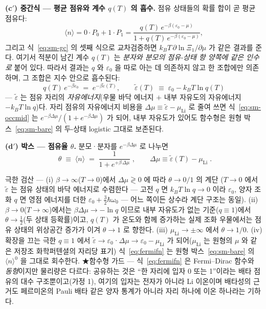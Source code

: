 \textbf{(c$'$) 중간식 --- 평균 점유와 계수 $q(T)$ 의 흡수.} 점유 상태들의 확률 합이 곧 평균 점유다:
\begin{equation}
\langle n\rangle=0\cdot P_0+1\cdot P_1
=\frac{q(T)\,e^{-\beta(\varepsilon_0-\mu)}}{1+q(T)\,e^{-\beta(\varepsilon_0-\mu)}},
\label{eq:sm-occmid}
\end{equation}
그리고 식~\eqref{eq:sm-gc} 의 셋째 식으로 교차검증하면 $k_BT\,\partial\ln\Xi_1/\partial\mu$ 가 같은
결과를 준다. 여기서 적분이 남긴 계수 $q(T)$ 는 \emph{분자와 분모의 점유-상태 항 양쪽에 같은 인수로}
붙어 있다. 따라서 결과는 $q$ 와 $\varepsilon_0$ 을 따로 아는 데 의존하지 않고 한 조합에만 의존하며,
그 조합은 지수 안으로 흡수된다:
\begin{equation}
q(T)\,e^{-\beta\varepsilon_0}\;=\;e^{-\beta\tilde\varepsilon(T)},
\qquad
\tilde\varepsilon(T)\;\equiv\;\varepsilon_0-k_BT\ln q(T)
\label{eq:sm-epstilde}
\end{equation}
--- $\tilde\varepsilon$ 는 점유 자리의 \emph{자유에너지}(우물 바닥 에너지 $+$ 내부 자유도의 자유에너지
$-k_BT\ln q$)다. 자리 점유의 자유에너지 비용을 $\Delta\mu\equiv\tilde\varepsilon-\mu_\mathrm{Li}$ 로
줄여 쓰면 식~\eqref{eq:sm-occmid} 는 $e^{-\beta\Delta\mu}/(1+e^{-\beta\Delta\mu})$ 가 되어, 내부
자유도가 있어도 함수형은 원형 박스~\eqref{eq:sm-bare} 의 두-상태 logistic 그대로 보존된다.

\textbf{(d$'$) 박스 --- 점유율 $\theta$.} 분모·분자를 $e^{-\beta\Delta\mu}$ 로 나누면
\begin{equation}
\boxed{\;\theta\;\equiv\;\langle n\rangle\;=\;\frac{1}{1+e^{+\beta\,\Delta\mu}}\;,
\qquad \Delta\mu\equiv\tilde\varepsilon(T)-\mu_\mathrm{Li}\;.}
\label{eq:fermifn}
\end{equation}
\begin{verifybox}
극한 검산 --- (i) $\beta\to\infty$($T\to0$)에서 $\Delta\mu\gtrless0$ 에 따라 $\theta\to0/1$ 의 계단
($T\to0$ 에서 $\tilde\varepsilon$ 는 점유 상태의 바닥 에너지로 수렴한다 --- 고전 $q$ 면 $k_BT\ln q\to0$
이라 $\varepsilon_0$, 양자 조화 $q$ 면 영점 에너지를 더한 $\varepsilon_0+\tfrac32\hbar\omega_0$ --- 어느
쪽이든 상수라 계단 구조는 동일). (ii) $\beta\to0$($T\to\infty$)에서는 $\beta\Delta\mu\to-\ln q$ 이므로
내부 자유도가 없는 기준($q\equiv1$)에서 $\theta\to\tfrac12$(두 상태 등확률)이고, $q(T)$ 가 온도와 함께
증가하는 실제 조화 우물에서는 점유 상태의 위상공간 증가가 이겨 $\theta\to1$ 로 향한다.
(iii) $\mu_\mathrm{Li}\to\pm\infty$ 에서 $\theta\to1/0$. (iv) 확장을 끄는 극한 $q\equiv1$ 에서
$\tilde\varepsilon\to\varepsilon_0$·$\Delta\mu\to\varepsilon_0-\mu_\mathrm{Li}$ 가 되어($\mu_\mathrm{Li}$ 는 원형의 $\mu$ 와
같은 저장조 화학퍼텐셜의 자리당 표기) 식~\eqref{eq:fermifn} 는 원형 박스~\eqref{eq:sm-bare} 의 $\langle n\rangle^{0}$ 을 그대로 회수한다.
★함수형 가드 --- 식~\eqref{eq:fermifn} 은 Fermi--Dirac 함수와 \emph{동형}이지만 물리량은 다르다:
공유하는 것은 ``한 자리에 입자 0 또는 1''이라는 배타 점유의 대수 구조뿐이고(가정 1), 여기의 입자는
전자가 아니라 Li 이온이며 배타성의 근거도 페르미온의 Pauli 배타 같은 양자 통계가 아니라 자리 하나에
이온 하나라는 기하다.
\end{verifybox}

